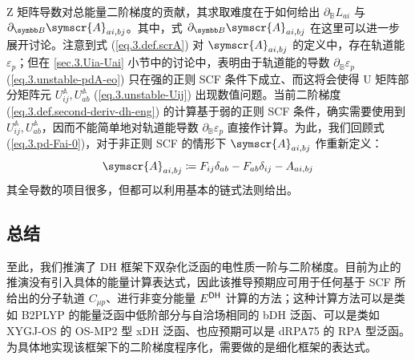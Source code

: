 Z 矩阵导数对总能量二阶梯度的贡献，其求取难度在于如何给出 $\partial_\mathbb{B} L_{ai}$ 与 $\partial_\mathbb{B} \symscr{A}_{ai, bj}$。其中，式 $\partial_\mathbb{B} \symscr{A}_{ai, bj}$ 在这里可以进一步展开讨论。注意到式 (\ref{eq.3.def.scrA}) 对 $\symscr{A}_{ai, bj}$ 的定义中，存在轨道能 $\varepsilon_p$；但在 \ref{sec.3.Uia-Uai} 小节中的讨论中，表明由于轨道能的导数 $\partial_\mathbb{B} \varepsilon_p$ (\ref{eq.3.unstable-pdA-eo}) 只在强的正则 SCF 条件下成立、而这将会使得 U 矩阵部分矩阵元 $U_{ij}^\mathbb{A}, U_{ab}^\mathbb{A}$ (\ref{eq.3.unstable-Uij}) 出现数值问题。当前二阶梯度 (\ref{eq.3.def.second-deriv-dh-eng}) 的计算基于弱的正则 SCF 条件，确实需要使用到 $U_{ij}^\mathbb{A}, U_{ab}^\mathbb{A}$，因而不能简单地对轨道能导数 $\partial_\mathbb{B} \varepsilon_p$ 直接作计算。为此，我们回顾式 (\ref{eq.3.pd-Fai-0})，对于非正则 SCF 的情形下 $\symscr{A}_{ai, bj}$ 作重新定义：
\begin{equation}
    \label{eq.3.def.scrA-noncanonical}
    \symscr{A}_{ai, bj} \coloneq F_{ij} \delta_{ab} - F_{ab} \delta_{ij} - A_{ai, bj}
\end{equation}
其全导数的项目很多，但都可以利用基本的链式法则给出。

\subsection{总结}

至此，我们推演了 DH 框架下双杂化泛函的电性质一阶与二阶梯度。目前为止的推演没有引入具体的能量计算表达式，因此该推导预期应可用于任何基于 SCF 所给出的分子轨道 $C_{\mu p}$、进行非变分能量 $E^{\textsf{DH}}$ 计算的方法；这种计算方法可以是类如 B2PLYP 的能量泛函中低阶部分与自洽场相同的 bDH 泛函、可以是类如 XYGJ-OS 的 OS-MP2 型 xDH 泛函、也应预期可以是 dRPA75 的 RPA 型泛函。为具体地实现该框架下的二阶梯度程序化，需要做的是细化框架的表达式。

